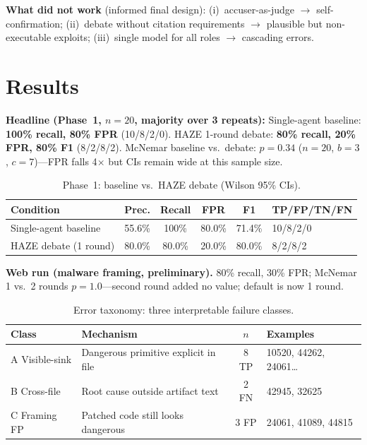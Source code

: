 \documentclass[10pt]{article}
\begin{document}
\textbf{What did not work} (informed final design): (i)~accuser-as-judge $\rightarrow$
self-confirmation; (ii)~debate without citation requirements $\rightarrow$ plausible but
non-executable exploits; (iii)~single model for all roles $\rightarrow$ cascading errors.

\section{Results}

\noindent\textbf{Headline (Phase~1, $n{=}20$, majority over 3 repeats):}
Single-agent baseline: \textbf{100\% recall, 80\% FPR} (10/8/2/0).
HAZE 1-round debate: \textbf{80\% recall, 20\% FPR, 80\% F1} (8/2/8/2).
McNemar baseline vs.\ debate: $p{=}0.34$ ($n{=}20$, $b{=}3$, $c{=}7$)---FPR falls
4$\times$ but CIs remain wide at this sample size.

\begin{table}[ht]
\centering
\small
\caption{Phase~1: baseline vs.\ HAZE debate (Wilson 95\% CIs).}
\begin{tabularx}{\textwidth}{@{}L{3.8cm}ccccL{2.0cm}@{}}
\toprule
Condition & Prec. & Recall & FPR & F1 & TP/FP/TN/FN \\
\midrule
Single-agent baseline & 55.6\% & 100\% & 80.0\% & 71.4\% & 10/8/2/0 \\
HAZE debate (1 round) & 80.0\% & 80.0\% & 20.0\% & 80.0\% & 8/2/8/2 \\
\bottomrule
\end{tabularx}
\end{table}

\noindent\textbf{Web run (malware framing, preliminary).} 80\% recall, 30\% FPR;
McNemar 1 vs.\ 2 rounds $p{=}1.0$---second round added no value; default is now 1 round.

\begin{table}[ht]
\centering
\small
\caption{Error taxonomy: three interpretable failure classes.}
\begin{tabularx}{\textwidth}{@{}L{2.8cm} X c L{2.8cm}@{}}
\toprule
Class & Mechanism & $n$ & Examples \\
\midrule
A Visible-sink & Dangerous primitive explicit in file & 8 TP & 10520, 44262, 24061\ldots \\
B Cross-file & Root cause outside artifact text & 2 FN & 42945, 32625 \\
C Framing FP & Patched code still looks dangerous & 3 FP & 24061, 41089, 44815 \\
\bottomrule
\end{tabularx}
\end{table}
\end{document}
